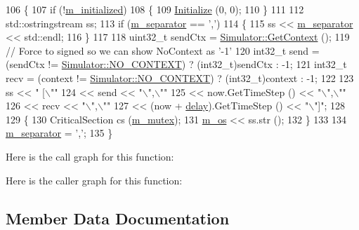 \begin{DoxyCode}
106 \{
107   \textcolor{keywordflow}{if} (!\hyperlink{classns3_1_1DesMetrics_a229b920334708658e4d3b5ebf5e24c4c}{m\_initialized})
108     \{
109       \hyperlink{classns3_1_1DesMetrics_a63bf3891d9fd2cf8c76b375b3db67756}{Initialize} (0, 0);
110     \}
111 
112   std::ostringstream ss;
113   \textcolor{keywordflow}{if} (\hyperlink{classns3_1_1DesMetrics_ab4a6d1bac1d7bae3db17cf362d4afaa8}{m\_separator} == \textcolor{charliteral}{','})
114     \{
115       ss << \hyperlink{classns3_1_1DesMetrics_ab4a6d1bac1d7bae3db17cf362d4afaa8}{m\_separator} << std::endl;
116     \}
117 
118   uint32\_t sendCtx = \hyperlink{classns3_1_1Simulator_a8514b74ee2c42916b351b33c4a963bb0}{Simulator::GetContext} ();
119   \textcolor{comment}{// Force to signed so we can show NoContext as '-1'}
120   int32\_t send = (sendCtx != \hyperlink{classns3_1_1Simulator_ab25cc4cd782af44b5843ce7258ecde10abaefe68ccc9945956c166aaeea2e986e}{Simulator::NO\_CONTEXT}) ? (int32\_t)sendCtx : -1;
121   int32\_t recv = (context != \hyperlink{classns3_1_1Simulator_ab25cc4cd782af44b5843ce7258ecde10abaefe68ccc9945956c166aaeea2e986e}{Simulator::NO\_CONTEXT}) ? (int32\_t)context : -1;
122   
123   ss <<                                 \textcolor{stringliteral}{"  [\(\backslash\)""}
124      << send                         << \textcolor{stringliteral}{"\(\backslash\)",\(\backslash\)""}
125      << now.GetTimeStep ()           << \textcolor{stringliteral}{"\(\backslash\)",\(\backslash\)""}
126      << recv                         << \textcolor{stringliteral}{"\(\backslash\)",\(\backslash\)""}
127      << (now + \hyperlink{lte_2model_2fading-traces_2fading__trace__generator_8m_a7964e6aa8f61a9d28973c8267a606ad8}{delay}).GetTimeStep () << \textcolor{stringliteral}{"\(\backslash\)"]"};
128 
129   \{
130     CriticalSection cs (\hyperlink{classns3_1_1DesMetrics_a05ad210056128f0154901516cbb884dc}{m\_mutex});
131     \hyperlink{classns3_1_1DesMetrics_ae84cea9d7b1c24d810e741bd8c46b430}{m\_os} << ss.str ();
132   \}
133 
134   \hyperlink{classns3_1_1DesMetrics_ab4a6d1bac1d7bae3db17cf362d4afaa8}{m\_separator} = \textcolor{charliteral}{','};
135 \}
\end{DoxyCode}


Here is the call graph for this function\+:




Here is the caller graph for this function\+:




\subsection{Member Data Documentation}
